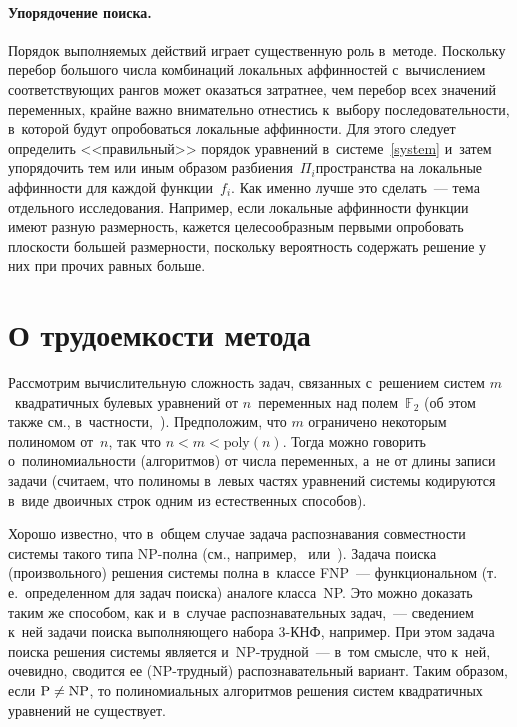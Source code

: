 \begin{multicols}{2}
\vspace*{-12pt}


\paragraph*{Упорядочение поиска.}
Порядок выполняемых действий играет существенную роль в~методе.
Поскольку перебор большого числа комбинаций локаль\-ных аффинностей с~вычислением 
соответствующих рангов может оказаться затратнее, чем перебор всех значений 
переменных,
крайне важно внимательно отнестись к~выбору последовательности, в~которой будут 
опробоваться локальные аффинности.
Для этого следует определить <<правильный>> порядок уравнений 
в~системе~\eqref{system} и~затем упорядочить тем или иным образом 
разбиения~$\Pi_i$\linebreak пространства на локальные аффинности для каж\-дой функции~$f_i$.
Как именно лучше это сделать~--- тема отдельного исследования.
Например, если локальные аффинности функции имеют разную\linebreak
 размерность, кажется 
целесообразным первыми опробовать плоскости большей размерности, поскольку 
вероятность содержать решение у них при прочих равных больше.



\section{О трудоемкости метода}
\label{complexity}

Рассмотрим вычислительную сложность задач, связанных с~решением систем 
$m$~квадратичных булевых уравнений от $n$~переменных над полем~$\mathbb{F}_2$ 
(об этом также см., в~частности,~\cite{Gor1995}).
Предположим, что $m$ ограничено некоторым полиномом от~$n$, так что 
$n<m<\mathrm{poly}\left(n\right)$. Тогда можно говорить о~полиномиальности (алгоритмов) от числа 
переменных, а~не от длины записи задачи (считаем, что полиномы в~левых частях 
уравнений системы кодируются в~виде двоичных строк одним из естественных 
способов).

Хорошо известно, что в~общем случае задача распознавания совместности системы 
такого типа NP-пол\-на (см., например,~\cite{FY1980} или~\cite[с.~321]{GJ1982}).
Задача поиска (произвольного) решения системы полна в~классе FNP~--- 
функциональном (т.\,е.\ определенном для задач поиска) аналоге класса~NP. Это 
можно доказать таким же способом, как и~в~случае распознавательных задач,~--- 
сведением к~ней задачи поиска выполняющего набора \mbox{3-КНФ}, например.
При этом задача поиска решения системы является и~NP-труд\-ной~--- в~том смысле, 
что к~ней, очевидно, сводится ее (NP-труд\-ный) распознавательный вариант.
Таким образом, если $\mathrm{P}\hm\neq\mathrm{NP}$, то полиномиальных алгоритмов 
решения систем квадратичных уравнений не существует.


\end{multicols}
